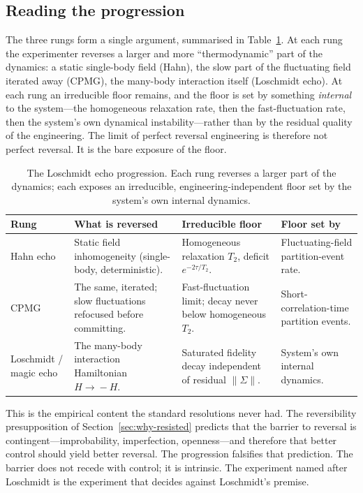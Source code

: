 \documentclass[11pt,a4paper]{article}
\theoremstyle{thmstyle}
\theoremstyle{definition}
\theoremstyle{remark}
\newcommand{\Ttwo}{T_{2}}
\begin{document}
\subsection{Reading the progression}
\label{sec:reading-progression}

The three rungs form a single argument, summarised in
Table~\ref{tab:progression}. At each rung the experimenter reverses a
larger and more ``thermodynamic'' part of the dynamics: a static
single-body field (Hahn), the slow part of the fluctuating field
iterated away (CPMG), the many-body interaction itself (Loschmidt echo).
At each rung an irreducible floor remains, and the floor is set by
something \emph{internal} to the system---the homogeneous relaxation
rate, then the fast-fluctuation rate, then the system's own dynamical
instability---rather than by the residual quality of the engineering. The
limit of perfect reversal engineering is therefore not perfect reversal.
It is the bare exposure of the floor.

\begin{table}[t]
\centering
\small
\caption{The Loschmidt echo progression. Each rung reverses a larger part
of the dynamics; each exposes an irreducible, engineering-independent
floor set by the system's own internal dynamics.}
\label{tab:progression}
\begin{tabular}{p{}p{}p{}p{}}
\toprule
\textbf{Rung} & \textbf{What is reversed} & \textbf{Irreducible floor} &
\textbf{Floor set by} \\
\midrule
Hahn echo \citep{hahn1950} &
Static field inhomogeneity (single-body, deterministic). &
Homogeneous relaxation $\Ttwo$, deficit $e^{-2\tau/\Ttwo}$. &
Fluctuating-field partition-event rate. \\
\addlinespace
CPMG \citep{carr1954,meiboom1958} &
The same, iterated; slow fluctuations refocused before committing. &
Fast-fluctuation limit; decay never below homogeneous $\Ttwo$. &
Short-correlation-time partition events. \\
\addlinespace
Loschmidt / magic echo \citep{rhim1971,levstein1998,jalabert2001} &
The many-body interaction Hamiltonian $H\!\to\!-H$. &
Saturated fidelity decay independent of residual $\|\Sigma\|$. &
System's own internal dynamics. \\
\bottomrule
\end{tabular}
\end{table}

This is the empirical content the standard resolutions never had. The
reversibility presupposition of Section~\ref{sec:why-resisted} predicts
that the barrier to reversal is contingent---improbability, imperfection,
openness---and therefore that better control should yield better
reversal. The progression falsifies that prediction. The barrier does not
recede with control; it is intrinsic. The experiment named after
Loschmidt is the experiment that decides against Loschmidt's premise.
\end{document}
